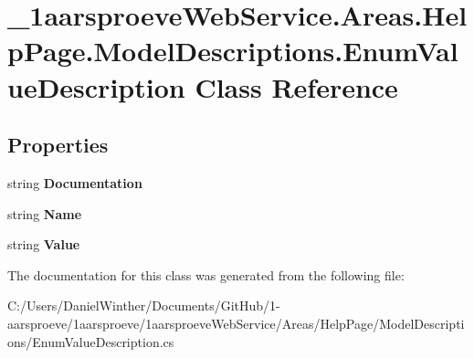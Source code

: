 \hypertarget{class__1aarsproeve_web_service_1_1_areas_1_1_help_page_1_1_model_descriptions_1_1_enum_value_description}{}\section{\+\_\+1aarsproeve\+Web\+Service.\+Areas.\+Help\+Page.\+Model\+Descriptions.\+Enum\+Value\+Description Class Reference}
\label{class__1aarsproeve_web_service_1_1_areas_1_1_help_page_1_1_model_descriptions_1_1_enum_value_description}
\subsection*{Properties}
\begin{DoxyCompactItemize}
\item 
\hypertarget{class__1aarsproeve_web_service_1_1_areas_1_1_help_page_1_1_model_descriptions_1_1_enum_value_description_a8b2b1e0baf970953a104b1c468a68c61}{}string {\bfseries Documentation}\label{class__1aarsproeve_web_service_1_1_areas_1_1_help_page_1_1_model_descriptions_1_1_enum_value_description_a8b2b1e0baf970953a104b1c468a68c61}

\item 
\hypertarget{class__1aarsproeve_web_service_1_1_areas_1_1_help_page_1_1_model_descriptions_1_1_enum_value_description_a7d3d2652afe86ecef65fa066bd7a233b}{}string {\bfseries Name}\label{class__1aarsproeve_web_service_1_1_areas_1_1_help_page_1_1_model_descriptions_1_1_enum_value_description_a7d3d2652afe86ecef65fa066bd7a233b}

\item 
\hypertarget{class__1aarsproeve_web_service_1_1_areas_1_1_help_page_1_1_model_descriptions_1_1_enum_value_description_a0670b18ee3d0ffe91340b5bc62e1b21a}{}string {\bfseries Value}\label{class__1aarsproeve_web_service_1_1_areas_1_1_help_page_1_1_model_descriptions_1_1_enum_value_description_a0670b18ee3d0ffe91340b5bc62e1b21a}

\end{DoxyCompactItemize}


The documentation for this class was generated from the following file\+:\begin{DoxyCompactItemize}
\item 
C\+:/\+Users/\+Daniel\+Winther/\+Documents/\+Git\+Hub/1-\/aarsproeve/1aarsproeve/1aarsproeve\+Web\+Service/\+Areas/\+Help\+Page/\+Model\+Descriptions/Enum\+Value\+Description.\+cs\end{DoxyCompactItemize}

